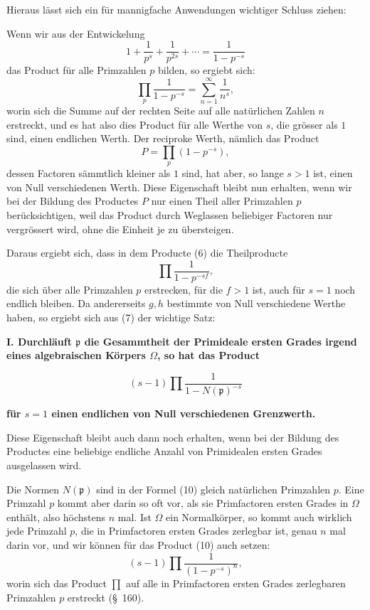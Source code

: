 \documentclass[11pt]{article}
\begin{document}
Hieraus lässt sich ein für mannigfache Anwendungen wichtiger Schluss ziehen:

Wenn wir aus der Entwickelung
\[
1+\frac1{p^s}+\frac1{p^{2s}}+\cdots=\frac1{1-p^{-s}}
\]
das Product für alle Primzahlen $p$ bilden, so ergiebt sich:
\begin{equation}
\prod_p\frac1{1-p^{-s}}=\sum_{n=1}^{\infty}\frac1{n^s},
\tag{8}
\end{equation}
worin sich die Summe auf der rechten Seite auf alle natürlichen Zahlen $n$ erstreckt, und es hat also dies Product für alle Werthe von $s$, die grösser als $1$ sind, einen endlichen Werth. Der reciproke Werth, nämlich das Product
\begin{equation}
P=\prod_p(1-p^{-s}),
\tag{9}
\end{equation}
dessen Factoren sämmtlich kleiner als $1$ sind, hat aber, so lange $s>1$ ist, einen von Null verschiedenen Werth. Diese Eigenschaft bleibt nun erhalten, wenn wir bei der Bildung des Productes $P$ nur einen Theil aller Primzahlen $p$ berücksichtigen, weil das Product durch Weglassen beliebiger Factoren nur vergrössert wird, ohne die Einheit je zu übersteigen.

Daraus ergiebt sich, dass in dem Producte (6) die Theilproducte
\[
\prod\frac1{1-p^{-sf}},
\]
die sich über alle Primzahlen $p$ erstrecken, für die $f>1$ ist, auch für $s=1$ noch endlich bleiben. Da andererseits $g,h$ bestimmte von Null verschiedene Werthe haben, so ergiebt sich aus (7) der wichtige Satz:

\begin{center}
\textbf{I. Durchläuft $\mathfrak p$ die Gesammtheit der Primideale ersten Grades irgend eines algebraischen Körpers $\Omega$, so hat das Product}
\end{center}
\begin{equation}
(s-1)\prod\frac1{1-N(\mathfrak p)^{-s}}
\tag{10}
\end{equation}
\begin{center}
\textbf{für $s=1$ einen endlichen von Null verschiedenen Grenzwerth.}
\end{center}

Diese Eigenschaft bleibt auch dann noch erhalten, wenn bei der Bildung des Productes eine beliebige endliche Anzahl von Primidealen ersten Grades ausgelassen wird.

Die Normen $N(\mathfrak p)$ sind in der Formel (10) gleich natürlichen Primzahlen $p$. Eine Primzahl $p$ kommt aber darin so oft vor, als sie Primfactoren ersten Grades in $\Omega$ enthält, also höchstens $n$ mal. Ist $\Omega$ ein Normalkörper, so kommt auch wirklich jede Primzahl $p$, die in Primfactoren ersten Grades zerlegbar ist, genau $n$ mal darin vor, und wir können für das Product (10) auch setzen:
\[
(s-1)\prod\frac1{(1-p^{-s})^n},
\]
worin sich das Product $\prod$ auf alle in Primfactoren ersten Grades zerlegbaren Primzahlen $p$ erstreckt (\S~160).
\end{document}
